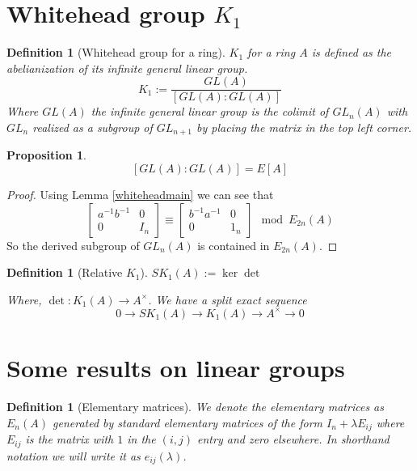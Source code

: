 \documentclass[12pt]{article}
\numberwithin{equation}{section}
\newcounter{dummy} \numberwithin{dummy}{section}
\newtheorem{definition}[dummy]{Definition}
\newtheorem{proposition}[dummy]{Proposition}
\begin{document}
	\section{Whitehead group $K_1$}
	\begin{definition}[Whitehead group for a ring] $K_1$ for a ring $A$ is defined as the abelianization of its infinite general linear group.
		$$K_1:= \frac{GL(A)}{[GL(A):GL(A)]}$$
		Where $GL(A)$ the infinite general linear group is the colimit of $GL_n(A)$ with $GL_{n}$ realized as a subgroup of $GL_{n+1}$ by placing the matrix in the top left corner. 
	\end{definition}
	\begin{proposition}
		\[ [GL(A):GL(A)]=E[A] \]
	\end{proposition}
	\begin{proof}
		Using Lemma \ref{whiteheadmain} we can see that \[ \begin{bmatrix}
			a^{-1}b^{-1} & 0 \\ 0 & I_n
		\end{bmatrix} \equiv \begin{bmatrix}
			b^{-1} a^{-1 } & 0 \\
			0 & 1_n
		\end{bmatrix} \mod E_{2n}(A)\]
		So the derived subgroup of $GL_n(A)$ is contained in $E_{2n}(A)$. 
	\end{proof}	
	
	
	\begin{definition}[Relative $K_1$]
		$SK_1(A):= \ker \det$
		
		Where, $\det : K_1(A) \to A^\times$. We have a split exact sequence
		\[ 0 \to SK_1(A) \to K_1(A) \to A^\times \to 0 \]
	\end{definition}
	
	
	\section{Some results on linear groups}
	\begin{definition}[Elementary matrices]
		We denote the elementary matrices as $E_n(A)$ generated by standard elementary matrices of the form $I_{n}+ \lambda E_{ij} $ where $E_{ij}$ is the matrix with $1$ in the $(i,j)$ entry and zero elsewhere. In shorthand notation we will write it as $e_{ij}(\lambda)$. 
	\end{definition}
	
\end{document}
